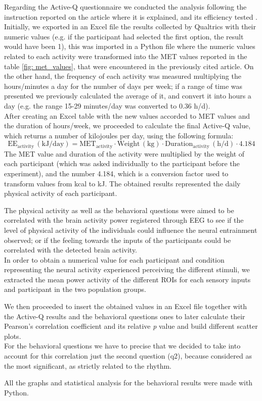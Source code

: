 Regarding the Active-Q questionnaire we conducted the analysis following the instruction reported on the article where it is explained, and its efficiency tested \parencite{Bonn_2012}. Initially, we exported in an Excel file the results collected by Qualtrics with their numeric values (e.g. if the participant had selected the first option, the result would have been 1), this was imported in a Python file where the numeric values related to each activity were transformed into the MET values reported in the table \ref{fig: met_values}, that were encountered in the previously cited article. On the other hand, the frequency of each activity was measured multiplying the hours/minutes a day for the number of days per week; if  a range of time was presented we previously calculated the average of it, and convert it into hours a day (e.g. the range 15-29 minutes/day was converted to 0.36 h/d).  \\
After creating an Excel table with the new values accorded to MET values and the duration of hours/week, we proceeded to calculate the final Active-Q value, which returns a number of kilojoules per day, using the following formula: 
\[
\text{EE}_{\text{activity}} \, (\text{kJ/day}) = \text{MET}_{\text{activity}} \cdot \text{Weight} \, (\text{kg}) \cdot \text{Duration}_{\text{activity}} \, (\text{h/d}) \cdot 4.184
\]
The MET value and duration of the activity were multiplied by the weight of each participant (which was asked individually to the participant before the experiment), and the number 4.184, which is a conversion factor used to transform values from kcal to kJ. The obtained results represented the daily physical activity of each participant. 

The physical activity as well as the behavioral questions were aimed to be correlated with the brain activity power registered through EEG to see if the level of physical activity of the individuals could influence the neural entrainment observed; or if the feeling towards the inputs of the participants could be correlated with the detected brain activity. \\ 
In order to obtain a numerical value for each participant and condition representing the neural activity experienced perceiving the different stimuli, we extracted the mean power activity of the different ROIs for each sensory inputs and participant in the two population groups. 

We then proceeded to insert the obtained values in an Excel file together with the Active-Q results and the behavioral questions ones to later calculate their Pearson's correlation coefficient and its relative \textit{p} value and build different scatter plots. \\
For the behavioral questions we have to precise that we decided to take into account for this correlation just the second question (q2), because considered as the most significant, as strictly related to the rhythm.

All the graphs and statistical analysis for the behavioral results were made with Python.